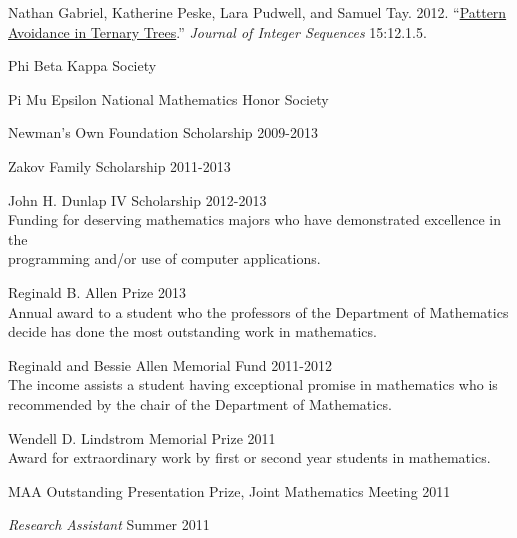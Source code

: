 \documentclass[11pt,article,oneside]{memoir}
\begin{document}
\bigskip



\ind Nathan Gabriel, Katherine Peske, Lara Pudwell, and Samuel Tay. 2012.
  ``\href{http://arxiv.org/abs/1110.2225}{Pattern Avoidance in Ternary Trees}.''
  \emph{Journal of Integer Sequences} 15:12.1.5. \vspace{0.05in}

\bigskip



\ind Phi Beta Kappa Society

\ind Pi Mu Epsilon National Mathematics Honor Society

\ind Newman's Own Foundation Scholarship \hfill {\small 2009-2013}

\ind Zakov Family Scholarship \hfill {\small 2011-2013}

\ind John H. Dunlap IV Scholarship \hfill {\small 2012-2013} \\
\footnotesize
  Funding for deserving mathematics majors who have demonstrated excellence in
  the \\ programming and/or use of computer applications.
\normalsize

\ind Reginald B. Allen Prize \hfill {\small 2013} \\
\footnotesize
  Annual award to a student who the professors of the Department of
  Mathematics decide has done the most outstanding work in mathematics.
\normalsize

\ind Reginald and Bessie Allen Memorial Fund \hfill {\small 2011-2012} \\
\footnotesize
  The income assists a student having exceptional promise in mathematics who is
  recommended by the chair of the Department of Mathematics.
\normalsize

\ind Wendell D. Lindstrom Memorial Prize \hfill {\small 2011} \\
\footnotesize
  Award for extraordinary work by first or second year students in mathematics.
\normalsize

\ind MAA Outstanding Presentation Prize, Joint Mathematics Meeting \hfill {\small 2011} \\

\medskip



\ind \emph{Research Assistant} \hfill {\small Summer 2011}
\end{document}
